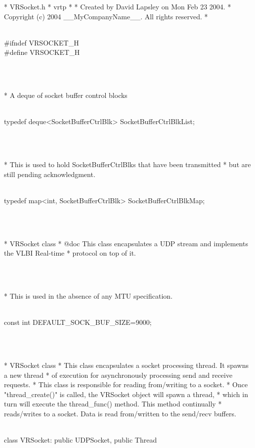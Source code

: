 \documentclass{article}
\begin{document}
 *  VRSocket.h
 *  vrtp
 *
 *  Created by David Lapsley on Mon Feb 23 2004.
 *  Copyright (c) 2004 __MyCompanyName__. All rights reserved.
 *
 \strut\goodbreak
{}\strut\nopagebreak\\
 #ifndef VRSOCKET_H
\\
 #define VRSOCKET_H
\strut\\\strut\\* A deque of socket buffer control blocks \strut\goodbreak
{}\strut\nopagebreak\\
 typedef deque<SocketBufferCtrlBlk> SocketBufferCtrlBlkList;
\strut\\\strut\\* This is used to hold SocketBufferCtrlBlks that have been transmitted
  * but are still pending acknowledgment.
  \strut\goodbreak
{}\strut\nopagebreak\\
 typedef map<int, SocketBufferCtrlBlk> SocketBufferCtrlBlkMap;
\strut\\\strut\\* VRSocket class
  * @doc This class encapsulates a UDP stream and implements the VLBI Real-time
  * protocol on top of it.
  \strut\\\strut\\* This is used in the absence of any MTU specification. \strut\goodbreak
{}\strut\nopagebreak\\
 const int DEFAULT_SOCK_BUF_SIZE=9000;
\strut\\\strut\\* VRSocket class
  * This class encapsulates a socket processing thread. It spawns a new thread
  * of execution for asynchronously processing send and receive requests.
  * This class is responsible for reading from/writing to a socket. 
  * Once "thread_create()" is called, the VRSocket object will spawn a thread, 
  * which in turn will execute the thread_func() method. This method continually 
  * reads/writes to a socket. Data is read from/written to the send/recv buffers.
  \strut\goodbreak
{}\strut\nopagebreak\\
 class VRSocket: public UDPSocket,  public Thread
\\
\end{document}
